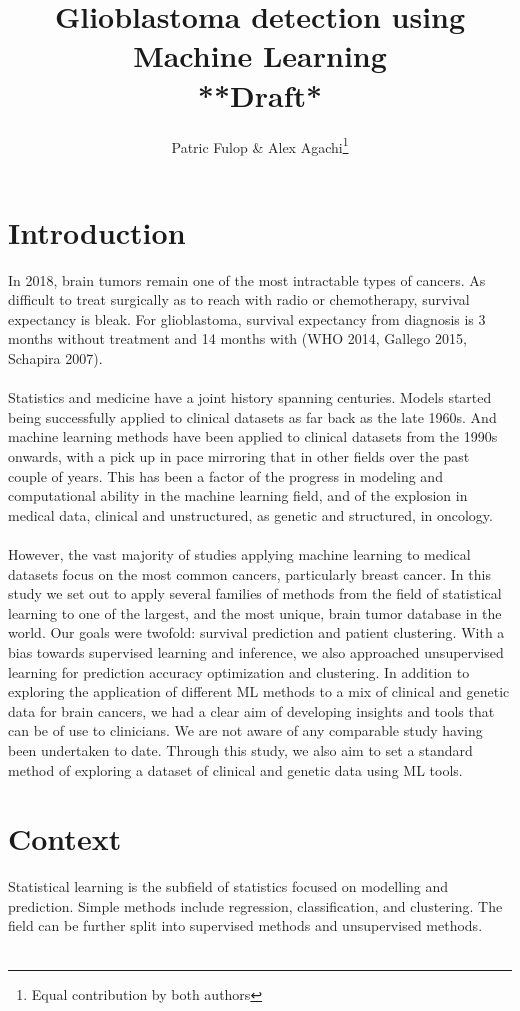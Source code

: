 \documentclass[a4paper]{article}
\title{Glioblastoma detection using Machine Learning\\**Draft*}
\author{Patric Fulop \& Alex Agachi\footnote{Equal contribution by both authors}}
\affil{The University of Edinburgh, Empiric Capital}
\begin{document}
\maketitle
\section{Introduction}
In 2018, brain tumors remain one of the most intractable types of cancers. As difficult to treat surgically as to reach with radio or chemotherapy, survival expectancy is bleak. For glioblastoma, survival expectancy from diagnosis is 3 months without treatment and 14 months with (WHO 2014, Gallego 2015, Schapira 2007). \\
\\
Statistics and medicine have a joint history spanning centuries. Models started being successfully applied to clinical datasets as far back as the late 1960s. And machine learning methods have been applied to clinical datasets from the 1990s onwards, with a pick up in pace mirroring that in other fields over the past couple of years. This has been a factor of the progress in modeling and computational ability in the machine learning field, and of the explosion in medical data, clinical and unstructured, as genetic and structured, in oncology. \\ 
\\
However, the vast majority of studies applying machine learning to medical datasets focus on the most common cancers, particularly breast cancer. In this study we set out to apply several families of methods from the field of statistical learning to one of the largest, and the most unique, brain tumor database in the world. Our goals were twofold: survival prediction and patient clustering. With a bias towards supervised learning and inference, we also approached unsupervised learning for prediction accuracy optimization and clustering. In addition to exploring the application of different ML methods to a mix of clinical and genetic data for brain cancers, we had a clear aim of developing insights and tools that can be of use to clinicians. We are not aware of any comparable study having been undertaken to date. Through this study, we also aim to set a standard method of exploring a dataset of clinical and genetic data using ML tools.

\section{Context}
Statistical learning is the subfield of statistics focused on modelling and prediction. Simple methods include regression, classification, and clustering. The field can be further split into supervised methods and unsupervised methods. \\
\\
\end{document}
